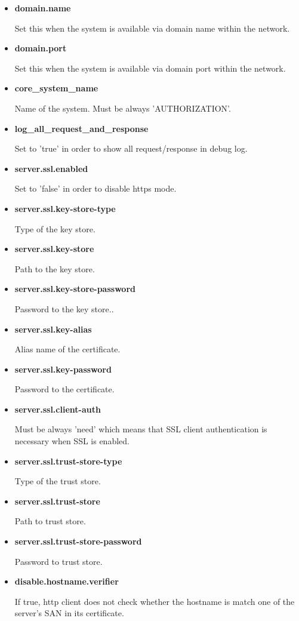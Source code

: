 \documentclass[a4paper]{arrowhead}
\begin{document}
\begin{itemize}
  \item \textbf{domain.name}
  
  Set this when the system is available via domain name within the network.
  
  \item \textbf{domain.port}
  
  Set this when the system is available via domain port within the network.
  
  \item \textbf{core\_system\_name}
  
  Name of the system. Must be always 'AUTHORIZATION'.
  
  \item \textbf{log\_all\_request\_and\_response}
  
  Set to 'true' in order to show all request/response in debug log.
  
  \item \textbf{server.ssl.enabled}
  
  Set to 'false' in order to disable https mode.
  
  \item \textbf{server.ssl.key-store-type}
  
  Type of the key store.
  
  \item \textbf{server.ssl.key-store}
  
  Path to the key store.
  
  \item \textbf{server.ssl.key-store-password}
  
  Password to the key store..
  
  \item \textbf{server.ssl.key-alias}
  
  Alias name of the certificate.
  
  \item \textbf{server.ssl.key-password}
  
  Password to the certificate.
  
  \item \textbf{server.ssl.client-auth}
  
  Must be always 'need' which means that SSL client authentication is necessary when SSL is enabled.
  
  \item \textbf{server.ssl.trust-store-type}
  
  Type of the trust store.
  
  \item \textbf{server.ssl.trust-store}
  
  Path to trust store.
  
  \item \textbf{server.ssl.trust-store-password}
  
  Password to trust store.
  
  \item \textbf{disable.hostname.verifier}
  
  If true, http client does not check whether the hostname is match one of the server's SAN in its certificate.
  \end{itemize}
  
\end{document}
